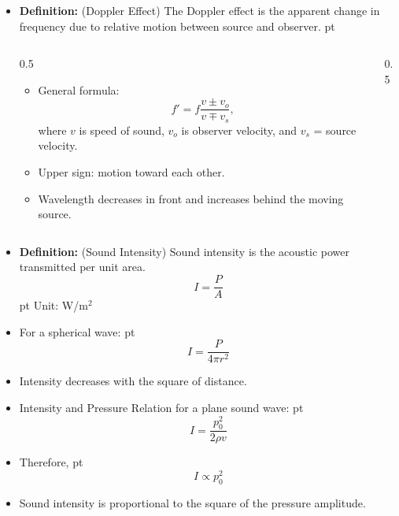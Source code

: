 \documentclass[t,aspectratio=169]{beamer}
\begin{document}
\begin{frame}
\begin{itemize}
\pagebreak
\item \textbf{Definition:} (Doppler Effect) The Doppler effect is the apparent change in frequency due to relative motion between source and observer.
 pt
\begin{columns}
  \begin{column}{0.5\linewidth}
\begin{itemize}
\item General formula:
$$ f' = f \frac{v \pm v_o}{v \mp v_s},$$
where $v$ is speed of sound, $v_o$ is observer velocity, and $v_s$ = source velocity.
\item Upper sign: motion toward each other.
\item Wavelength decreases in front and increases behind the moving source.
\end{itemize}
\end{column}
  \begin{column}{0.5\linewidth}
\begin{center}
\end{center}
\end{column}
\end{columns}

\pagebreak
\item \textbf{Definition:} (Sound Intensity) Sound intensity is the acoustic power transmitted per unit area.
  $$ I = \frac{P}{A} $$
 pt
Unit: W/m$^2$
\item For a spherical wave:
 pt
$$ I = \frac{P}{4\pi r^2} $$ 
\item Intensity decreases with the square of distance.
\item Intensity and Pressure Relation for a plane sound wave:
 pt
$$ I = \frac{p_0^2}{2\rho v} $$
\item Therefore,
 pt
$$I \propto p_0^2$$
\item Sound intensity is proportional to the square of the pressure amplitude.



\end{itemize}
\end{frame}
\end{document}
